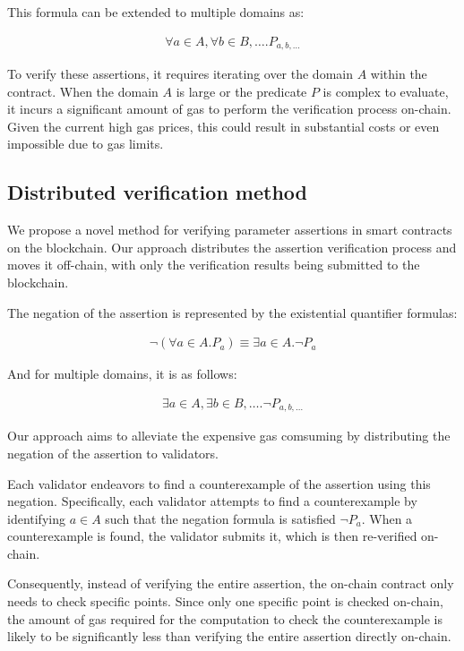 \documentclass[runningheads]{llncs}
\begin{document}
This formula can be extended to multiple domains as:

\begin{gather}
\label{eq:2}
\forall a \in A, \forall b \in B, \dots .P_{a, b, \dots}
\end{gather} 

To verify these assertions, it requires iterating over the domain $A$ within the contract. When the domain $A$ is large or the predicate $P$ is complex to evaluate, it incurs a significant amount of gas to perform the verification process on-chain.  Given the current high gas prices, this could result in substantial costs or even impossible due to gas limits. 

\subsection{Distributed verification method}
We propose a novel method for verifying parameter assertions in smart contracts on the blockchain. Our approach distributes the assertion verification process and moves it off-chain, with only the verification results being submitted to the blockchain.

The negation of the assertion is represented by the existential quantifier formulas:

\begin{gather}
\label{eq:3}
\neg (\forall a \in A. P_{a}) \equiv \exists a \in A. \neg P_{a}
\end{gather}

And for multiple domains, it is as follows:

\begin{gather}
\label{eq:4}
\exists a \in A, \exists b \in B, \dots. \neg P_{a, b, \dots}
\end{gather}



Our approach aims to alleviate the expensive gas comsuming by distributing the negation of the assertion to validators. 

Each validator endeavors to find a counterexample of the assertion using this negation. Specifically, each validator attempts to find a counterexample by identifying $a \in A$ such that the negation formula is satisfied $\neg P_{a}$. When a counterexample is found, the validator submits it, which is then re-verified on-chain. 

Consequently, instead of verifying the entire assertion, the on-chain contract only needs to check specific points. Since only one specific point is checked on-chain, the amount of gas required for the computation to check the counterexample is likely to be significantly less than verifying the entire assertion directly on-chain.
\end{document}
